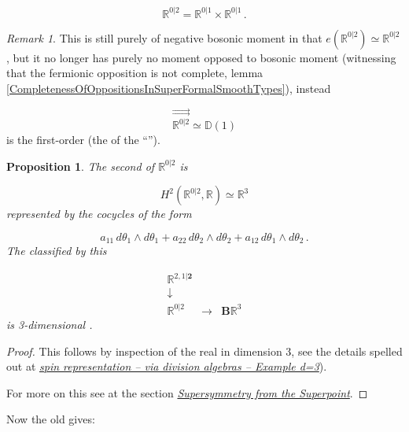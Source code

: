 \documentclass[12pt,titlepage]{article}
\newcommand{\itexarray}[1]{\begin{matrix}#1\end{matrix}}
\theoremstyle{plain}
\newtheorem{prop}{Proposition}
\theoremstyle{definition}
\theoremstyle{remark}
\newtheorem{remark}{Remark}
\begin{document}
\begin{displaymath}
\mathbb{R}^{0|2}
  =
  \mathbb{R}^{0|1}\times \mathbb{R}^{0|1}
  \,.
\end{displaymath}
\begin{remark}
\label{}\hypertarget{}{}
This is still purely of negative bosonic moment in that $e(\mathbb{R}^{0|2}) \simeq \mathbb{R}^{0|2}$, but it no longer has purely no moment opposed to bosonic moment (witnessing that the fermionic opposition is not complete, lemma \ref{CompletenessOfOppositionsInSuperFormalSmoothTypes}), instead

\begin{displaymath}
\stackrel{\rightrightarrows}{\mathbb{R}^{0|2}}
  \simeq
  \mathbb{D}(1)
\end{displaymath}
is the first-order  (the  of the ``'').

\end{remark}
\begin{prop}
\label{3dSuperMinkowskiSpacetime}\hypertarget{3dSuperMinkowskiSpacetime}{}
The second   of $\mathbb{R}^{0\vert 2}$ is

\begin{displaymath}
H^2(\mathbb{R}^{0\vert 2}, \mathbb{R})
  \simeq
  \mathbb{R}^3
\end{displaymath}
represented by the cocycles of the form

\begin{displaymath}
a_{11}
  \,
  d\theta_1 \wedge d\theta_1
   +
  a_{22}
  \,
  d\theta_2 \wedge d\theta_2
  +
  a_{12}
  \,
  d\theta_1 \wedge d\theta_2
  \,.
\end{displaymath}
The  classified by this

\begin{displaymath}
\itexarray{
     \mathbb{R}^{2,1|\mathbf{2}}
     \\
     \downarrow
     \\
     \mathbb{R}^{0|2}
     &\stackrel{}{\longrightarrow}&
     \mathbf{B} \mathbb{R}^3
  }
\end{displaymath}
is 3-dimensional .

\end{prop}
\begin{proof}
This follows by inspection of the real  in dimension 3, see the details spelled out at \emph{\href{http://ncatlab.org/nlab/show/spin%20representation#RealSpinorRepsIn3d}{spin representation -- via division algebras -- Example d=3}}).

For more on this see at  the section \emph{\href{https://ncatlab.org/nlab/show/geometry+of+physics+--+supersymmetry#SupersymmetryFromTheSuperpoint}{Supersymmetry from the Superpoint}}.

\end{proof}
Now the old  gives:
\end{document}

